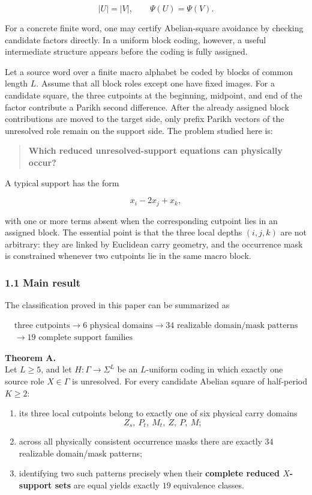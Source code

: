 \documentclass[
  british,
  a4paper,
  11pt]{article}
\providecommand{\tightlist}{%
  \setlength{\itemsep}{0pt}\setlength{\parskip}{0pt}}
\begin{document}
\[
|U|=|V|,
\qquad
\Psi(U)=\Psi(V).
\]

For a concrete finite word, one may certify Abelian-square avoidance by
checking candidate factors directly. In a uniform block coding, however,
a useful intermediate structure appears before the coding is fully
assigned.

Let a source word over a finite macro alphabet be coded by blocks of
common length \(L\). Assume that all block roles except one have fixed
images. For a candidate square, the three cutpoints at the beginning,
midpoint, and end of the factor contribute a Parikh second difference.
After the already assigned block contributions are moved to the target
side, only prefix Parikh vectors of the unresolved role remain on the
support side. The problem studied here is:

\begin{quote}
\textbf{Which reduced unresolved-support equations can physically
occur?}
\end{quote}

A typical support has the form

\[
x_i-2x_j+x_k,
\]

with one or more terms absent when the corresponding cutpoint lies in an
assigned block. The essential point is that the three local depths
\((i,j,k)\) are not arbitrary: they are linked by Euclidean carry
geometry, and the occurrence mask is constrained whenever two cutpoints
lie in the same macro block.

\subsubsection{1.1 Main result}\label{main-result}

The classification proved in this paper can be summarized as

\[
\boxed{
\begin{gathered}
\text{three cutpoints}
\longrightarrow
6\text{ physical domains}
\longrightarrow
34\text{ realizable domain/mask patterns}\\
\longrightarrow
19\text{ complete support families}
\end{gathered}
}
\]

\textbf{Theorem A.}\\
Let \(L\ge5\), and let \(H:\Gamma\to\Sigma^L\) be an \(L\)-uniform
coding in which exactly one source role \(X\in\Gamma\) is unresolved.
For every candidate Abelian square of half-period \(K\ge2\):

\begin{enumerate}
\def\labelenumi{\arabic{enumi}.}
\tightlist
\item
  its three local cutpoints belong to exactly one of six physical carry
  domains \[
  Z_s,\ P_t,\ M_t,\ Z,\ P,\ M;
  \]
\item
  across all physically consistent occurrence masks there are exactly
  \(34\) realizable domain/mask patterns;
\item
  identifying two such patterns precisely when their \textbf{complete
  reduced \(X\)-support sets} are equal yields exactly \(19\)
  equivalence classes.
\end{enumerate}
\end{document}
